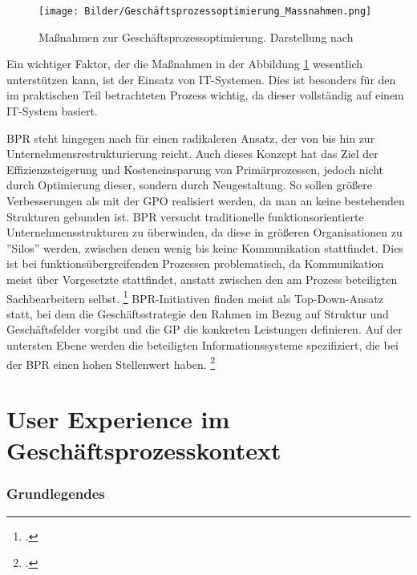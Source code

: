 \begin{figure}[H]
    \centering
    \texttt{[image: Bilder/Geschäftsprozessoptimierung\_Massnahmen.png]}
    \caption[Ma\ss nahmen zur Geschäftsprozessoptimierung]{Ma\ss nahmen zur Geschäftsprozessoptimierung. Darstellung nach \cite[][]{theorie_bleicher_organisation_1991}}
    \label{fig:Geschäftsprozessoptimierung_Massnahmen}
\end{figure}

Ein wichtiger Faktor, der die Ma\ss nahmen in der Abbildung \ref{fig:Geschäftsprozessoptimierung_Massnahmen} wesentlich unterstützen kann, ist der Einsatz von IT-Systemen. Dies ist besonders für den im praktischen Teil betrachteten Prozess wichtig, da dieser vollständig auf einem IT-System basiert.

BPR steht hingegen nach \cite[][]{theorie_hammer_champy_business_reengineering_1996} für einen radikaleren Ansatz, der von  bis hin zur Unternehmensrestrukturierung reicht. Auch dieses Konzept hat das Ziel der Effizienzsteigerung und Kosteneinsparung von Primärprozessen, jedoch nicht durch Optimierung dieser, sondern durch Neugestaltung. So sollen grö\ss ere Verbesserungen als mit der GPO realisiert werden, da man an keine bestehenden Strukturen gebunden ist. BPR versucht traditionelle funktionsorientierte Unternehmensstrukturen zu überwinden, da diese in grö\ss eren Organisationen zu ''Silos'' werden, zwischen denen wenig bis keine Kommunikation stattfindet. Dies ist bei funktionsübergreifenden Prozessen problematisch, da Kommunikation meist über Vorgesetzte stattfindet, anstatt zwischen den am Prozess beteiligten Sachbearbeitern selbst. \footcite[Vgl.][S. 12f]{theorie_gadatsch_grundkurs_geschäftsprozessmanagement_2010} BPR-Initiativen finden meist als Top-Down-Ansatz statt, bei dem die Geschäftsstrategie den Rahmen im Bezug auf Struktur und Geschäftsfelder vorgibt und die GP die konkreten Leistungen definieren. Auf der untersten Ebene werden die beteiligten Informationssysteme spezifiziert, die bei der BPR einen hohen Stellenwert haben. \footcite[Vgl.][S. 24]{theorie_osterle_business_1995}

\section{User Experience im Geschäftsprozesskontext}

\subsubsection{Grundlegendes}

